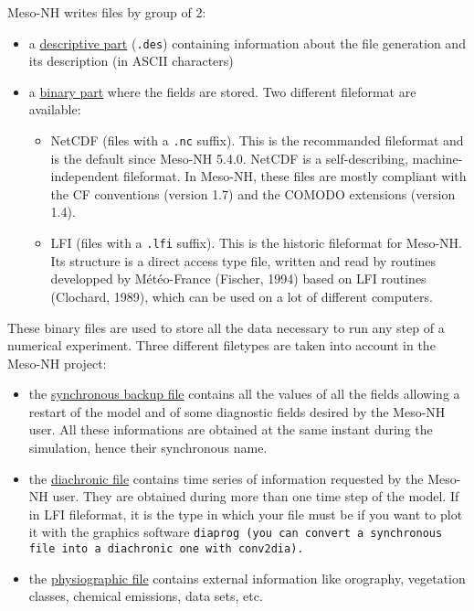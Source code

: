 Meso-NH writes files by group of 2:
\begin{itemize}
\item
 a \underline{descriptive part} ({\tt .des}) containing 
information about the file generation and its description (in ASCII
characters)
\item
a \underline{binary part} where the fields are stored. Two different fileformat are available:
  \begin{itemize}
  \item NetCDF (files with a {\tt .nc} suffix). This is the recommanded fileformat and is the default since Meso-NH 5.4.0.
        NetCDF is a self-describing, machine-independent fileformat.
        In Meso-NH, these files are mostly compliant with the CF conventions (version 1.7) and the COMODO extensions (version 1.4).
  \item LFI  (files with a {\tt .lfi} suffix). This is the historic fileformat for Meso-NH. Its structure
        is a direct access type file, written and read by routines developped by
        M\'et\'eo-France (Fischer, 1994) based on {\sc LFI} routines (Clochard, 1989), 
        which can be used on a lot of different computers.
  \end{itemize}
\end{itemize}

These binary files are used to store all the data necessary to run any step 
of a numerical experiment. Three different filetypes are taken into account in the 
Meso-NH project:
\begin{itemize}
\item
the \underline{synchronous backup file} contains all the values of all the fields allowing a
restart of the model and of some diagnostic fields desired by the Meso-NH user.
All these informations are obtained at the same instant during the simulation,
hence their synchronous name.
\item
the \underline{diachronic file} contains time series of information requested by the Meso-NH 
user. They are obtained during more than one time step of the model.
If in LFI fileformat, it is the type in which your file must be if you want to plot it with
the graphics software \tt diaprog \rm (you can convert a synchronous file
into a diachronic one with \tt conv2dia\rm ).
\item
the \underline{physiographic file} contains external information like 
orography, vegetation classes, chemical emissions, data sets, etc.
\end{itemize}

